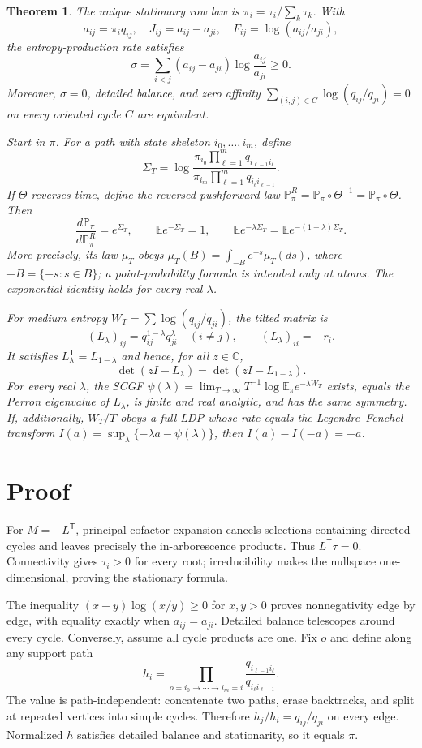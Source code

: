 \documentclass[10pt]{article}
\newcommand{\E}{\mathbb E}
\newcommand{\Pp}{\mathbb P}
\newtheorem{theorem}{Theorem}
\begin{document}
\begin{theorem}\label{thm:main}
The unique stationary row law is $\pi_i=\tau_i/\sum_k\tau_k$.  With
\[
 a_{ij}=\pi_iq_{ij},\quad J_{ij}=a_{ij}-a_{ji},\quad
 F_{ij}=\log(a_{ij}/a_{ji}),
\]
the entropy-production rate satisfies
\[
 \sigma=\sum_{i<j}(a_{ij}-a_{ji})\log\frac{a_{ij}}{a_{ji}}\ge0.
\]
Moreover, $\sigma=0$, detailed balance, and zero affinity
$\sum_{(i,j)\in C}\log(q_{ij}/q_{ji})=0$ on every oriented cycle $C$ are equivalent.

Start in $\pi$.  For a path with state skeleton $i_0,\ldots,i_m$, define
\[
 \Sigma_T=\log\frac{\pi_{i_0}\prod_{\ell=1}^m q_{i_{\ell-1}i_\ell}}
 {\pi_{i_m}\prod_{\ell=1}^m q_{i_\ell i_{\ell-1}}}.
\]
If $\Theta$ reverses time, define the reversed pushforward law
$\Pp_\pi^R=\Pp_\pi\circ\Theta^{-1}=\Pp_\pi\circ\Theta$. Then
\[
 \frac{d\Pp_\pi}{d\Pp_\pi^R}=e^{\Sigma_T},\qquad
 \E e^{-\Sigma_T}=1,\qquad
 \E e^{-\lambda\Sigma_T}=\E e^{-(1-\lambda)\Sigma_T}.
\]
More precisely, its law $\mu_T$ obeys
$\mu_T(B)=\int_{-B}e^{-s}\mu_T(ds)$, where $-B=\{-s:s\in B\}$; a
point-probability formula is intended only at atoms. The exponential identity
holds for every real $\lambda$.

For medium entropy $W_T=\sum\log(q_{ij}/q_{ji})$, the tilted matrix is
\[
 (L_\lambda)_{ij}=q_{ij}^{1-\lambda}q_{ji}^{\lambda}\quad(i\ne j),
 \qquad (L_\lambda)_{ii}=-r_i.
\]
It satisfies $L_\lambda^{\mathsf T}=L_{1-\lambda}$ and hence, for all $z\in\mathbb C$,
\[
 \det(zI-L_\lambda)=\det(zI-L_{1-\lambda}).
\]
For every real $\lambda$, the SCGF
$\psi(\lambda)=\lim_{T\to\infty}T^{-1}\log\E_\pi e^{-\lambda W_T}$
exists, equals the Perron eigenvalue of $L_\lambda$, is finite and real analytic,
and has the same symmetry. If, additionally, $W_T/T$ obeys a full LDP whose
rate equals the Legendre--Fenchel transform
$I(a)=\sup_\lambda\{-\lambda a-\psi(\lambda)\}$, then
$I(a)-I(-a)=-a$.
\end{theorem}

\section{Proof}
For $M=-L^{\mathsf T}$, principal-cofactor expansion cancels selections containing directed cycles and leaves precisely the in-arborescence products.  Thus $L^{\mathsf T}\tau=0$.  Connectivity gives $\tau_i>0$ for every root; irreducibility makes the nullspace one-dimensional, proving the stationary formula.

The inequality $(x-y)\log(x/y)\ge0$ for $x,y>0$ proves nonnegativity edge by edge, with equality exactly when $a_{ij}=a_{ji}$.  Detailed balance telescopes around every cycle.  Conversely, assume all cycle products are one.  Fix $o$ and define along any support path
\[
 h_i=\prod_{o=i_0\to\cdots\to i_m=i}\frac{q_{i_{\ell-1}i_\ell}}{q_{i_\ell i_{\ell-1}}}.
\]
The value is path-independent: concatenate two paths, erase backtracks, and split at repeated vertices into simple cycles.  Therefore $h_j/h_i=q_{ij}/q_{ji}$ on every edge.  Normalized $h$ satisfies detailed balance and stationarity, so it equals $\pi$.
\end{document}
